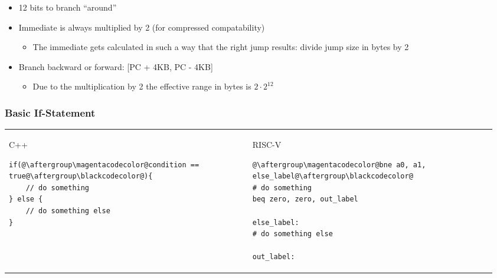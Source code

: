 \begin{itemize}
    \item 12 bits to branch ``around''
    \item Immediate is always multiplied by 2 (for compressed compatability)
          \begin{itemize}
              \item The immediate gets calculated in such a way that the right jump results: divide jump size in bytes by 2
          \end{itemize}
    \item Branch backward or forward: [PC + 4KB, PC - 4KB]
          \begin{itemize}
              \item Due to the multiplication by 2 the effective range in bytes is $2\cdot {2}^{12}$
          \end{itemize}
\end{itemize}

\subsubsection{Basic If-Statement}

\setlength{\oldtabcolsep}{\tabcolsep}\setlength\tabcolsep{2pt}
\begin{tabular}[width=\linewidth]{p{0.48\linewidth} p{0.48\linewidth}}
    C++
    \begin{lstlisting}[escapechar=@]
if(@\aftergroup\magentacodecolor@condition == true@\aftergroup\blackcodecolor@){
    // do something
} else {
    // do something else
}\end{lstlisting}
     &
    RISC-V
    \begin{lstlisting}[escapechar=@]
@\aftergroup\magentacodecolor@bne a0, a1, else_label@\aftergroup\blackcodecolor@
# do something
beq zero, zero, out_label

else_label:
# do something else

out_label:
\end{lstlisting}
\end{tabular}
\setlength{\tabcolsep}{\oldtabcolsep}

